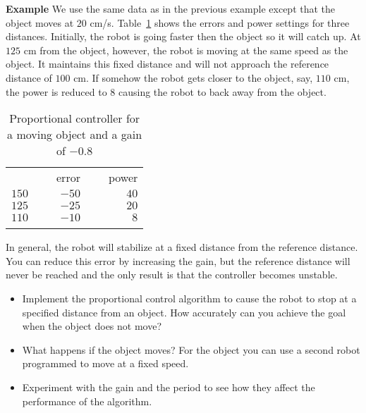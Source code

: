 \smallskip

\noindent\textbf{Example} We use the same data as in the previous example except that the object moves at $20$ cm/s. Table~\ref{tab.p-controller-moving} shows the errors and power settings for three distances. Initially, the robot is going faster then the object so it will catch up. At $125$ cm from the object, however, the robot is moving at the same speed as the object. It maintains this fixed distance and will not approach the reference distance of $100$ cm. If somehow the robot gets closer to the object, say, $110$ cm,  the power is reduced to $8$ causing the robot to back away from the object.

\begin{table}
\caption{Proportional controller for a moving object and a gain of $-0.8$}
\label{tab.p-controller-moving}
\begin{tabular}{rrr}
\svhline\noalign{\smallskip}
\multicolumn{1}{c}{distance} & \multicolumn{1}{c}{\ \ \ error}& \multicolumn{1}{c}{\ \ \ power}\\
\noalign{\smallskip}\svhline\noalign{\smallskip}
$150$ & $-50$ & $40$\\
$125$ & $-25$ & $20$\\
$110$ & $-10$ & $8$\\
\noalign{\smallskip}\svhline\noalign{\smallskip}
\end{tabular}
\end{table}

In general, the robot will stabilize at a fixed distance from the reference distance. You can reduce this error by increasing the gain, but the reference distance will never be reached and the only result is that the controller becomes unstable.

\begin{framed}
\begin{itemize}
\item Implement the proportional control algorithm to cause the robot to stop at a specified distance from an object. How accurately can you achieve the goal when the object does not move?
\item What happens if the object moves? For the object you can use a second robot programmed to move at a fixed speed.
\item Experiment with the gain and the period to see how they affect the performance of the algorithm.
\end{itemize}
\end{framed}

